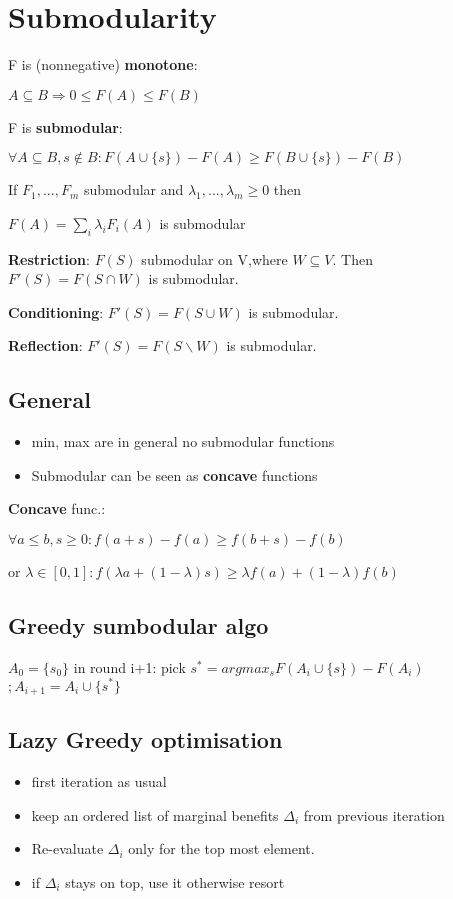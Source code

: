 \documentclass[a4paper,11pt,twocolumn]{article}
\begin{document}
\section{Submodularity}

F is (nonnegative) \textbf{monotone}: 

$A \subseteq B \Rightarrow 0 \leq F(A)  \leq F(B)$


F is \textbf{submodular}: 

$\forall A \subseteq B, s \notin B:  F(A \cup \lbrace s  \rbrace) - F(A) \geq F(B \cup \lbrace s \rbrace ) - F(B)$



If $F_1,...,F_m$ submodular and $\lambda_1,...,\lambda_m \geq 0 $ then

$F(A) = \sum_i \lambda_i F_i(A)$ is submodular 

\textbf{Restriction}: $F(S)$ submodular on V,where $W \subseteq V$. Then $F'(S) = F(S \cap W)$ is submodular.

\textbf{Conditioning}: $F'(S) = F(S \cup W)$ is submodular.

\textbf{Reflection}: $F'(S) = F(S \backslash W)$ is submodular.

\subsection{General}
\begin{itemize}[noitemsep,topsep=0pt,parsep=0pt,partopsep=0pt]
\item min, max are in general no submodular functions
\item Submodular can be seen as \textbf{concave} functions
\end{itemize} 

\textbf{Concave} func.: 

$\forall a \leq b, s \geq 0 : f(a+s)- f(a) \geq f(b+s) -f(b)$

or $\lambda \in [0,1]: f(\lambda a+ (1-\lambda)s) \geq \lambda f(a) + (1-\lambda) f(b)$
\subsection{Greedy sumbodular algo}
$
A_0=\{ s_0 \}
$ in round i+1:	pick
$s^* = argmax_s F( A_i \cup  \{s\} ) - F(A_i)$
$; A_{i+1} = A_{i} \cup \{s^*\}$

\subsection{Lazy Greedy optimisation}
\begin{itemize}[noitemsep,topsep=0pt,parsep=0pt,partopsep=0pt]
\item first iteration as usual
\item keep an ordered list of marginal benefits $\Delta_i$ from previous iteration
\item 	Re-evaluate $\Delta_i$ only for the top most element.
\item if $\Delta_i$ stays on top, use it otherwise resort
\end{itemize}
\end{document}
